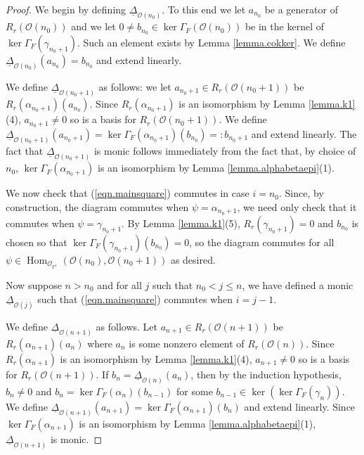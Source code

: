 \documentclass[10pt]{amsart}
\theoremstyle{definition}
\theoremstyle{remark}
\numberwithin{equation}{section}
\begin{document}
\begin{proof}
We begin by defining $\underline{\Delta}_{\mathcal{O}(n_{0})}$.  To this end we let $a_{n_{0}}$ be a generator of $R_{r}(\mathcal{O}(n_{0}))$ and we let $0 \neq b_{n_{0}} \in {\operatorname{ker }\Gamma_{F}}(\mathcal{O}(n_{0}))$ be in the kernel of ${\operatorname{ker }\Gamma_{F}}(\gamma_{n_{0}+1})$.  Such an element exists by Lemma \ref{lemma.cokker}.  We define $\underline{\Delta}_{\mathcal{O}(n_{0})}(a_{n_{0}})=b_{n_{0}}$ and extend linearly.

We define $\underline{\Delta}_{\mathcal{O}(n_{0}+1)}$ as follows:  we let $a_{n_{0}+1} \in R_{r}(\mathcal{O}(n_{0}+1))$ be $R_{r}(\alpha_{n_{0}+1})(a_{n_{0}})$.  Since $R_{r}(\alpha_{n_{0}+1})$ is an isomorphism by Lemma \ref{lemma.k1}(4), $a_{n_{0}+1} \neq 0$ so is a basis for $R_{r}(\mathcal{O}(n_{0}+1))$.  We define $\underline{\Delta}_{\mathcal{O}(n_{0}+1)}(a_{n_{0}+1})={\operatorname{ker }\Gamma_{F}}(\alpha_{n_{0}+1})(b_{n_{0}})=:b_{n_{0}+1}$ and extend linearly.  The fact that $\underline{\Delta}_{\mathcal{O}(n_{0}+1)}$ is monic follows immediately from the fact that, by choice of $n_{0}$, ${\operatorname{ker }\Gamma_{F}}(\alpha_{n_{0}+1})$ is an isomorphism by Lemma \ref{lemma.alphabetaepi}(1).

We now check that (\ref{eqn.mainsquare}) commutes in case $i=n_{0}$.  Since, by construction, the diagram commutes when $\psi=\alpha_{n_{0}+1}$, we need only check that it commutes when $\psi=\gamma_{n_{0}+1}$.  By Lemma \ref{lemma.k1}(5), $R_{r}(\gamma_{n_{0}+1})=0$ and $b_{n_{0}}$ is chosen so that ${\operatorname{ker }\Gamma_{F}}(\gamma_{n_{0}+1})(b_{n_{0}})=0$, so the diagram commutes for all $\psi \in \operatorname{Hom}_{\mathcal{O}_{\mathbb{P}^{1}}}(\mathcal{O}(n_{0}),\mathcal{O}(n_{0}+1))$ as desired.

Now suppose $n>n_{0}$ and for all $j$ such that $n_{0} < j \leq n$, we have defined a monic $\underline{\Delta}_{\mathcal{O}(j)}$ such that (\ref{eqn.mainsquare}) commutes when $i=j-1$.

We define $\underline{\Delta}_{\mathcal{O}(n+1)}$ as follows.  Let $a_{n+1} \in R_{r}(\mathcal{O}(n+1))$ be $R_{r}(\alpha_{n+1})(a_{n})$ where $a_{n}$ is some nonzero element of $R_{r}(\mathcal{O}(n))$.  Since $R_{r}(\alpha_{n+1})$ is an isomorphism by Lemma \ref{lemma.k1}(4), $a_{n+1} \neq 0$ so is a basis for $R_{r}(\mathcal{O}(n+1))$.  If $b_{n}=\underline{\Delta}_{\mathcal{O}(n)}(a_{n})$, then by the induction hypothesis, $b_{n} \neq 0$ and $b_{n} = {\operatorname{ker }\Gamma_{F}}(\alpha_{n})(b_{n-1})$ for some $b_{n-1} \in \operatorname{ker }({\operatorname{ker }\Gamma_{F}}(\gamma_{n}))$.  We define $\underline{\Delta}_{\mathcal{O}(n+1)}(a_{n+1})={\operatorname{ker }\Gamma_{F}}(\alpha_{n+1})(b_{n})$ and extend linearly.  Since ${\operatorname{ker }\Gamma_{F}}(\alpha_{n+1})$ is an isomorphism by Lemma \ref{lemma.alphabetaepi}(1), $\underline{\Delta}_{\mathcal{O}(n+1)}$ is monic.


\end{proof}
\end{document}
